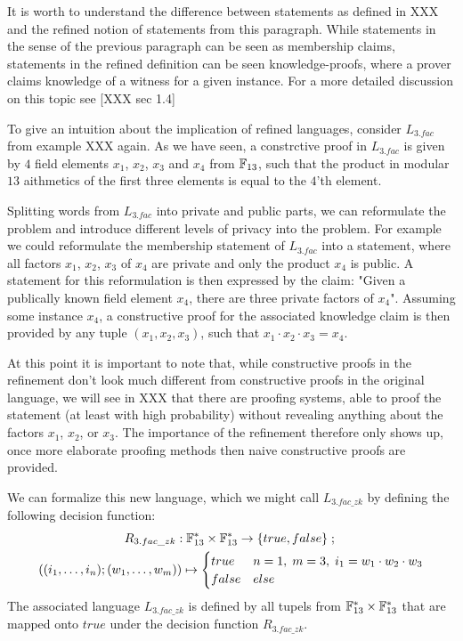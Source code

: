 It is worth to understand the difference between statements as defined in XXX and the refined notion of statements from this paragraph. While statements in the sense of the previous paragraph can be seen as membership claims, statements in the refined definition can be seen knowledge-proofs, where a prover claims knowledge of a witness for a given instance. For a more detailed discussion on this topic see [XXX sec 1.4]
\begin{example}[3-factorization] To give an intuition about the implication of refined languages, consider $L_{3.fac}$ from example XXX again. As we have seen, a constrctive proof in $L_{3.fac}$ is given by $4$ field elements $x_1$, $x_2$, $x_3$ and $x_4$ from $\mathbb{F}_{13}$, such that the product in modular $13$ aithmetics of the first three elements is equal to the $4$'th element. 

Splitting words from $L_{3.fac}$ into private and public parts, we can reformulate the problem and introduce different levels of privacy into the problem. For example we could reformulate the membership statement of $L_{3.fac}$ into a statement, where all factors $x_1$, $x_2$, $x_3$ of $x_4$ are private and only the product $x_4$ is public. A statement for this reformulation is then expressed by the claim: "Given a publically known field element $x_4$, there are three private factors of $x_4$". Assuming some instance $x_4$, a constructive proof for the associated knowledge claim is then provided by any tuple $(x_1,x_2,x_3)$, such that $x_1\cdot x_2\cdot x_3= x_4$. 

At this point it is important to note that, while constructive proofs in the refinement don't look much different from constructive proofs in the original language, we will see in XXX that there are proofing systems, able to proof the statement (at least with high probability) without revealing anything about the factors $x_1$, $x_2$, or $x_3$. The importance of the refinement therefore only shows up, once more elaborate proofing methods then naive constructive proofs are provided.

We can formalize this new language, which we might call $L_{3.fac\_zk}$ by defining the following decision function: 
\begin{multline*}
R_{3.fac\_zk} : \mathbb{F}_{13}^* \times \mathbb{F}_{13}^* \to \{true, false\}\;;\;\\
((i_1,\ldots,i_n);(w_1,\ldots, w_m)) \mapsto
\begin{cases}
true & n=1,\; m=3,\; i_1 = w_1\cdot w_2 \cdot w_3\\
false & else
\end{cases}
\end{multline*}
The associated language $L_{3.fac\_zk}$ is defined by all tupels from $\mathbb{F}_{13}^* \times \mathbb{F}_{13}^*$ that are mapped onto $true$ under the decision function $R_{3.fac\_zk}$. 


\end{example}
